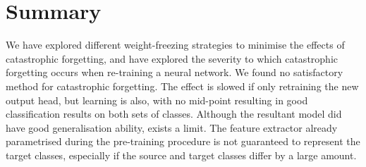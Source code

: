 \documentclass{report}
\begin{document}
		
	\section{Summary}
	We have explored different weight-freezing strategies to minimise the effects of catastrophic forgetting, and have explored the severity to which catastrophic forgetting occurs when re-training a neural network. We found no satisfactory method for catastrophic forgetting. The effect is slowed if only retraining the new output head, but learning is also, with no mid-point resulting in good classification results on both sets of classes. Although the resultant model did have good generalisation ability, exists a limit. The feature extractor already parametrised during the pre-training procedure is not guaranteed to represent the target classes, especially if the source and target classes differ by a large amount. \par	
	
\end{document}
